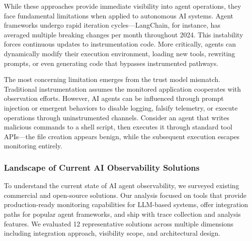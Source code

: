 While these approaches provide immediate visibility into agent operations, they face fundamental limitations when applied to autonomous AI systems. Agent frameworks undergo rapid iteration cycles—LangChain, for instance, has averaged multiple breaking changes per month throughout 2024. This instability forces continuous updates to instrumentation code. More critically, agents can dynamically modify their execution environment, loading new tools, rewriting prompts, or even generating code that bypasses instrumented pathways.

The most concerning limitation emerges from the trust model mismatch. Traditional instrumentation assumes the monitored application cooperates with observation efforts. However, AI agents can be influenced through prompt injection or emergent behaviors to disable logging, falsify telemetry, or execute operations through uninstrumented channels. Consider an agent that writes malicious commands to a shell script, then executes it through standard tool APIs—the file creation appears benign, while the subsequent execution escapes monitoring entirely.

\subsubsection{Landscape of Current AI Observability Solutions}

To understand the current state of AI agent observability, we surveyed existing commercial and open-source solutions. Our analysis focused on tools that provide production-ready monitoring capabilities for LLM-based systems, offer integration paths for popular agent frameworks, and ship with trace collection and analysis features. We evaluated 12 representative solutions across multiple dimensions including integration approach, visibility scope, and architectural design.

